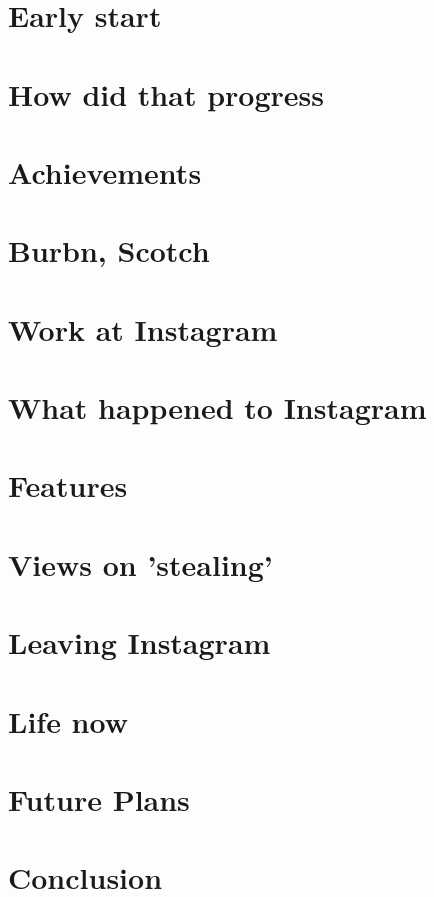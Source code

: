\documentclass[12pt]{article}
\begin{document}
    \section{Early start}
    \section{How did that progress}
    \section{Achievements}
    \section{Burbn, Scotch}
    \section{Work at Instagram}
    \section{What happened to Instagram}
    \section{Features}
    \section{Views on 'stealing'}
    \section{Leaving Instagram}
    \section{Life now}
    \section{Future Plans}

    \section{Conclusion}
\end{document}
